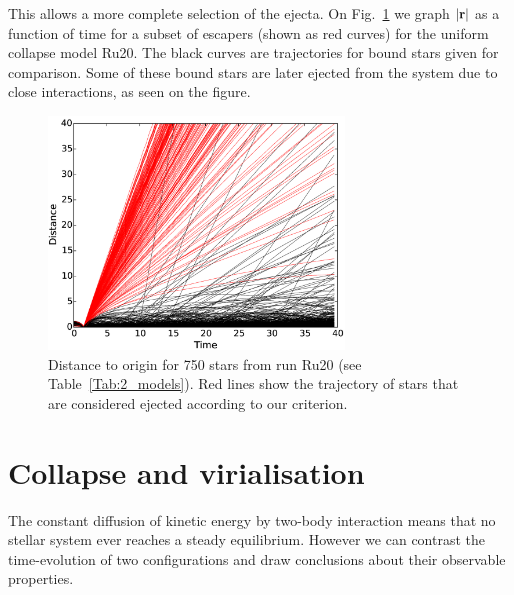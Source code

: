 This allows a more complete selection of the ejecta.  On Fig.~\ref{Fig:3_DistOrigin} we graph  $|\bold{r}|$  as a function of time for a subset of escapers (shown as red curves) for the uniform collapse model Ru20. The black curves are trajectories for bound stars given for comparison. Some of these bound stars are later ejected from the system due to close interactions, as seen on the figure.

\begin{figure}
\begin{center}
\includegraphics[width=0.7\textwidth]{Figures/3_DistOrigin}
\caption[Distance to origin over time for escapers and bound stars]{Distance to origin for 750 stars from run Ru20 (see Table~\ref{Tab:2_models}). Red lines show the trajectory of stars that are considered ejected according to our criterion.}
\label{Fig:3_DistOrigin}
\end{center}
\end{figure}



  
\section{Collapse and virialisation}
\label{Sec:Collapse}


The constant diffusion of kinetic energy by two-body interaction means that no stellar system ever reaches a steady equilibrium. However we can contrast the time-evolution of two configurations and draw conclusions about their observable properties. 







